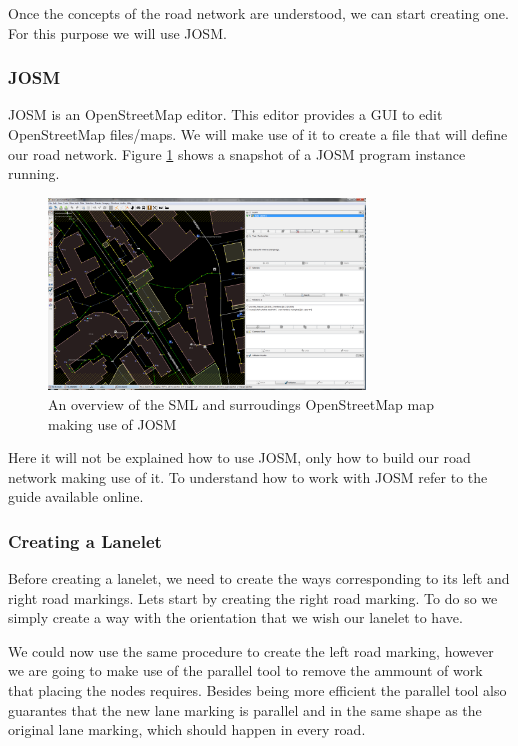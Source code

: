 Once the concepts of the road network are understood, we can start creating one. For this purpose we will use JOSM.

\subsubsection{JOSM}

JOSM\cite{JOSM} is an OpenStreetMap editor. This editor provides a GUI to edit OpenStreetMap files/maps. We will make use of it to create a file that will define our road network. Figure \ref{fig:josm_sml} shows a snapshot of a JOSM program instance running.

\begin{figure}[h!]
    \centering
    \includegraphics[width=0.75\textwidth]{JOSM_SML}
    \caption{An overview of the SML and surroudings OpenStreetMap map making use of JOSM \label{fig:josm_sml} }
\end{figure}

Here it will not be explained how to use JOSM, only how to build our road network making use of it. To understand how to work with JOSM refer to the guide available online.

\subsubsection{Creating a Lanelet}

Before creating a lanelet, we need to create the ways corresponding to its left and right road markings. Lets start by creating the right road marking. To do so we simply create a way with the orientation that we wish our lanelet to have.

We could now use the same procedure to create the left road marking, however we are going to make use of the parallel tool to remove the ammount of work that placing the nodes requires. Besides being more efficient the parallel tool also guarantes that the new lane marking is parallel and in the same shape as the original lane marking, which should happen in every road.


